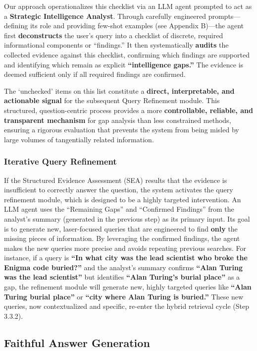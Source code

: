 \documentclass[11pt]{article}
\begin{document}
Our approach operationalizes this checklist via an LLM agent prompted to act as a \textbf{Strategic Intelligence Analyst}. Through carefully engineered prompts---defining its role and providing few-shot examples (see Appendix B)---the agent first \textbf{deconstructs} the user's query into a checklist of discrete, required informational components or ``findings.'' It then systematically \textbf{audits} the collected evidence against this checklist, confirming which findings are supported and identifying which remain as explicit \textbf{``intelligence gaps.''} The evidence is deemed sufficient only if all required findings are confirmed.

The `unchecked' items on this list constitute a \textbf{direct, interpretable, and actionable signal} for the subsequent Query Refinement module. This structured, question-centric process provides a more \textbf{controllable, reliable, and transparent mechanism} for gap analysis than less constrained methods, ensuring a rigorous evaluation that prevents the system from being misled by large volumes of tangentially related information.

\subsubsection{Iterative Query Refinement}

If the Structured Evidence Assessment (SEA) results that the evidence is insufficient to correctly answer the question, the system activates the query refinement module, which is designed to be a highly targeted intervention. An LLM agent uses the ``Remaining Gaps'' and ``Confirmed Findings'' from the analyst's summary (generated in the previous step) as its primary input. Its goal is to generate new, laser-focused queries that are engineered to find \textbf{only} the missing pieces of information. By leveraging the confirmed findings, the agent makes the new queries more precise and avoids repeating previous searches. For instance, if a query is \textbf{``In what city was the lead scientist who broke the Enigma code buried?''} and the analyst's summary confirms \textbf{``Alan Turing was the lead scientist''} but identifies \textbf{``Alan Turing's burial place''} as a gap, the refinement module will generate new, highly targeted queries like \textbf{``Alan Turing burial place''} or \textbf{``city where Alan Turing is buried.''} These new queries, now contextualized and specific, re-enter the hybrid retrieval cycle (Step 3.3.2). 

\subsection{Faithful Answer Generation}
\end{document}
